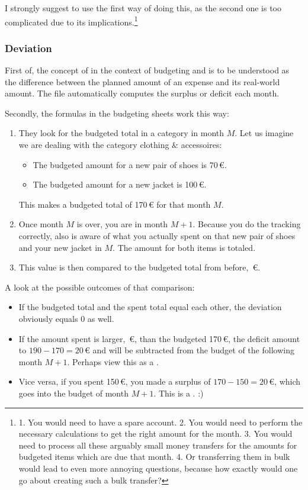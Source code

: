 I strongly suggest to use the first way of doing this, as the second one is too complicated due to its implications.\footnote{1. You would need to have a spare account.
2. You would need to perform the necessary calculations to get the right amount for the month.
3. You would need to process all these arguably small money transfers for the amounts for budgeted items which are due that month.
4. Or transferring them in bulk would lead to even more annoying questions, because how exactly would one go about creating such a bulk transfer?}

\subsubsection{Deviation}
\label{subsubsec:deviation}

First of, the concept of  in the context of budgeting and \tfn is to be understood as the difference between the planned amount of an expense and its real-world amount.
The file automatically computes the surplus or deficit each month.

Secondly, the formulas in the budgeting sheets work this way:
\begin{enumerate}
	\item They look for the budgeted total in a category in month \( M \).
	Let us imagine we are dealing with the category clothing \& accessoires:
	\begin{itemize}
		\item The budgeted amount for a new pair of shoes is 70\,€.
		\item The budgeted amount for a new jacket is 100\,€.
	\end{itemize}
	This makes a budgeted total of 170\,€ for that month \( M \).
	\item Once month \( M \) is over, you are in month \( M+1 \).
	Because you do the tracking correctly, \tfn also is aware of what you actually spent on that new pair of shoes and your new jacket in \( M \).
	The amount for both items is totaled.
	\item This value is then compared to the budgeted total from before, \,€.
\end{enumerate}

A look at the possible outcomes of that comparison:
\begin{itemize}
	\item If the budgeted total and the spent total equal each other, the deviation obviously equals 0 as well.
	\item If the amount spent is larger, \,€, than the budgeted 170\,€, the deficit amount to \( 190-170 = 20\)\,€ and will be subtracted from the budget of the following month \( M+1 \).
	Perhaps view this as a .
	\item Vice versa, if you spent 150\,€, you made a surplus of \( 170-150 = 20 \)\,€, which goes into the budget of month \( M+1 \).
	This is a . :)
\end{itemize}

